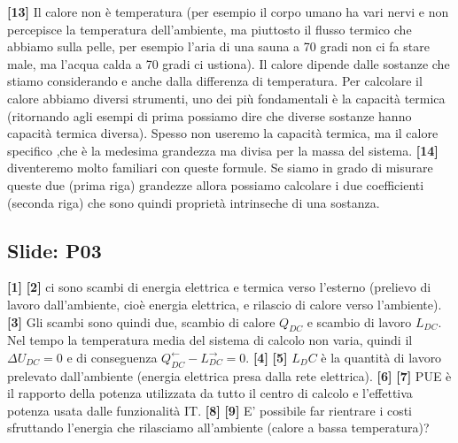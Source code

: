 \newline\textbf{[13]}\; Il calore non è temperatura (per esempio il corpo umano ha vari nervi e non percepisce la temperatura dell'ambiente, ma piuttosto il flusso termico che abbiamo sulla pelle, per esempio l'aria di una sauna a 70 gradi non ci fa stare male, ma l'acqua calda a 70 gradi ci ustiona). Il calore dipende dalle sostanze che stiamo considerando e anche dalla differenza di temperatura. Per calcolare il calore abbiamo diversi strumenti, uno dei più fondamentali è la capacità termica (ritornando agli esempi di prima possiamo dire che diverse sostanze hanno capacità termica diversa). Spesso non useremo la capacità termica, ma il calore specifico ,che è la medesima grandezza ma divisa per la massa del sistema. 
\newline\textbf{[14]}\; diventeremo molto familiari con queste formule. Se siamo in grado di misurare queste due (prima riga) grandezze allora possiamo calcolare i due coefficienti (seconda riga) che sono quindi proprietà intrinseche di una sostanza.
\subsection*{Slide: P03}
\textbf{[1]}\;
\newline\textbf{[2]}\; ci sono scambi di energia elettrica e termica verso l'esterno (prelievo di lavoro dall'ambiente, cioè energia elettrica,  e rilascio di calore verso l'ambiente).
\newline\textbf{[3]}\; Gli scambi sono quindi due, scambio di calore $Q_{DC}$ e scambio di lavoro $L_{DC}$. Nel tempo la temperatura media del sistema di calcolo non varia, quindi il $\Delta U_{DC} = 0$ e di conseguenza $Q_{DC}^\leftarrow - L_{DC}^\rightarrow  = 0$.
\newline\textbf{[4]}\;
\newline\textbf{[5]}\; $L_DC$ è la quantità di lavoro prelevato dall'ambiente (energia elettrica presa dalla rete elettrica).
\newline\textbf{[6]}\; 
\newline\textbf{[7]}\; PUE è il rapporto della potenza utilizzata da tutto il centro di calcolo e l'effettiva potenza usata dalle funzionalità IT.
\newline\textbf{[8]}\;
\newline\textbf{[9]}\; E' possibile far rientrare i costi sfruttando l'energia che rilasciamo all'ambiente (calore a bassa temperatura)?